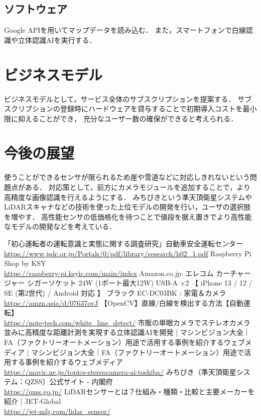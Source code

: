\documentclass[titlepage,a4paper]{jsarticle}
\begin{document}
\subsection{ソフトウェア}
Google APIを用いてマップデータを読み込む．
また，スマートフォンで白線認識\cite{白線}や立体認識AI\cite{立体認識}を実行する．

\section{ビジネスモデル}
ビジネスモデルとして，サービス全体のサブスクリプションを提案する．
サブスクリプションの登録時にハードウェアを貸与することで初期導入コストを最小限に抑えることができ，
充分なユーザー数の確保ができると考えられる．

\section{今後の展望}
使うことができるセンサが限られるため崖や雪道などに対応しきれないという問題点がある．
対応策として，前方にカメラモジュールを追加することで，より高精度な画像認識を行えるようにする．
みちびきという準天頂衛星システムやLiDARスキャナなどの技術を使った上位モデルの開発を行い，ユーザの選択肢を増やす．
高性能センサの低価格化を待つことで値段を据え置きでより高性能なモデルの開発などを考えている．

\begin{thebibliography}{99}
   「初心運転者の運転意識と実態に関する調査研究」自動車安全運転センター\\%
  \url{https://www.jsdc.or.jp/Portals/0/pdf/library/research/h02_1.pdf}
   Raspberry Pi Shop by KSY\\
  \url{https://raspberry-pi.ksyic.com/main/index}
  Amazon.co.jp: エレコム カーチャージャー シガーソケット 24W (1ポート最大12W) USB-A ×2
  【 iPhone 13 / 12 / SE (第2世代) / Android 対応 】 ブラック EC-DC03BK : 家電＆カメラ\\
  \url{https://amzn.asia/d/07637ovJ}
  【OpenCV】直線/白線を検出する方法【自動運転】\\
  \url{https://note-tech.com/white_line_detect/}
  市販の単眼カメラでステレオカメラ並みに高精度な距離計測を実現する立体認識AIを開発 | マシンビジョン大全｜FA（ファクトリーオートメーション）用途で活用する事例を紹介するウェブメディア | マシンビジョン大全｜FA（ファクトリーオートメーション）用途で活用する事例を紹介するウェブメディア\\
  \url{https://mavic.ne.jp/topics-stereocamera-ai-toshiba/}
  みちびき（準天頂衛星システム：QZSS）公式サイト - 内閣府\\
  \url{https://qzss.go.jp/}
  LiDARセンサーとは？仕組み・種類・比較と主要メーカーを紹介 | JET‐Global\\
  \url{https://jet-mfg.com/lidar_sensor/}
\end{thebibliography}
\end{document}
